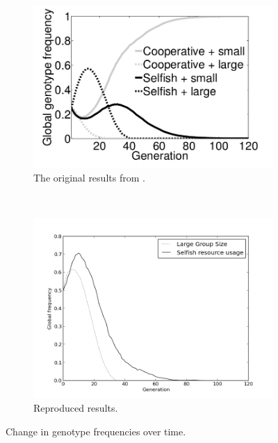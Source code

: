 \documentclass[11pt]{ecsarticle}
\begin{document}
\begin{figure}
        \centering
        \begin{subfigure}[b]{0.4\textwidth}
                \includegraphics[width=\textwidth]{orig_b.png}
                \caption{The original results from \cite{powers2007individual}.}
                \label{fig:rep:A}
        \end{subfigure}%
        ~ %
        \begin{subfigure}[b]{0.4\textwidth}
                \includegraphics[width=\textwidth]{Code2/fig2.png}
                \caption{Reproduced results.}
                \label{fig:rep:B}
        \end{subfigure}
        \caption{Change in genotype frequencies over time.}\label{fig:B}
\end{figure}
\end{document}
